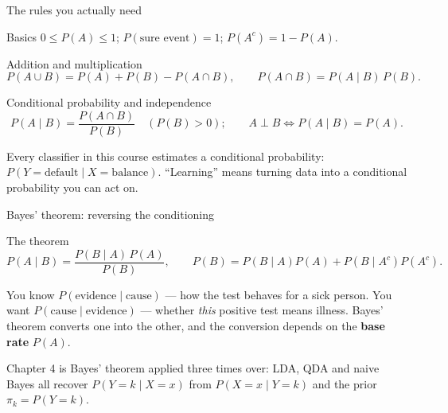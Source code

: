 \documentclass[aspectratio=169,11pt]{beamer}
\begin{document}
\begin{frame}{The rules you actually need}
  \footnotesize
  \begin{block}{Basics}
    $0 \le P(A) \le 1$; \quad $P(\text{sure event}) = 1$; \quad
    $P(A^c) = 1 - P(A)$.
  \end{block}
  \begin{block}{Addition and multiplication}
    \[
      P(A \cup B) = P(A) + P(B) - P(A \cap B),
      \qquad
      P(A \cap B) = P(A \mid B)\,P(B).
    \]
  \end{block}
  \begin{block}{Conditional probability and independence}
    \[
      P(A \mid B) = \frac{P(A \cap B)}{P(B)} \quad (P(B) > 0);
      \qquad
      A \perp B \iff P(A \mid B) = P(A).
    \]
  \end{block}
  \begin{takeaway}
    Every classifier in this course estimates a conditional probability:
    $P(Y = \text{default} \mid X = \text{balance})$. ``Learning'' means
    turning data into a conditional probability you can act on.
  \end{takeaway}
\end{frame}

\begin{frame}{Bayes' theorem: reversing the conditioning}
  \begin{block}{The theorem}
    \[
      P(A \mid B) = \frac{P(B \mid A)\,P(A)}{P(B)},
      \qquad
      P(B) = P(B \mid A)P(A) + P(B \mid A^c)P(A^c).
    \]
  \end{block}
  \begin{readme}
    You know $P(\text{evidence} \mid \text{cause})$ --- how the test behaves
    for a sick person. You want $P(\text{cause} \mid \text{evidence})$ ---
    whether \emph{this} positive test means illness. Bayes' theorem
    converts one into the other, and the conversion depends on the
    \textbf{base rate} $P(A)$.
  \end{readme}
  \begin{takeaway}
    Chapter 4 is Bayes' theorem applied three times over: LDA, QDA and naive
    Bayes all recover
    $P(Y=k \mid X=x)$ from $P(X = x\mid Y=k)$ and the prior $\pi_k = P(Y=k)$.
  \end{takeaway}
\end{frame}
\end{document}
